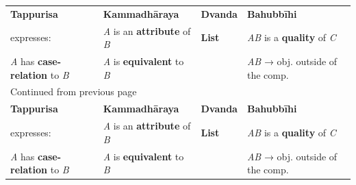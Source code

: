 \documentclass[11pt,oneside]{memoir}
\begin{document}
\hspace{-20pt}%
\begin{minipage}{\linewidth+10pt}%

\begin{longtable}{llll}
\textbf{Tappurisa} & \textbf{Kammadhāraya} & \textbf{Dvanda} & \textbf{Bahubbīhi}\\
expresses: & \emph{A} is an \textbf{attribute} of \emph{B} & \textbf{List} & \emph{AB} is a \textbf{quality} of \emph{C}\\
\emph{A} has \textbf{case-relation} to \emph{B} & \emph{A} is \textbf{equivalent} to \emph{B} &  & \emph{AB} → obj. outside of the comp.\\
\hline
\endfirsthead
\multicolumn{4}{l}{Continued from previous page} \\

\textbf{Tappurisa} & \textbf{Kammadhāraya} & \textbf{Dvanda} & \textbf{Bahubbīhi}\\
expresses: & \emph{A} is an \textbf{attribute} of \emph{B} & \textbf{List} & \emph{AB} is a \textbf{quality} of \emph{C}\\
\emph{A} has \textbf{case-relation} to \emph{B} & \emph{A} is \textbf{equivalent} to \emph{B} &  & \emph{AB} → obj. outside of the comp. \\


\end{longtable}
\end{minipage}
\end{document}

